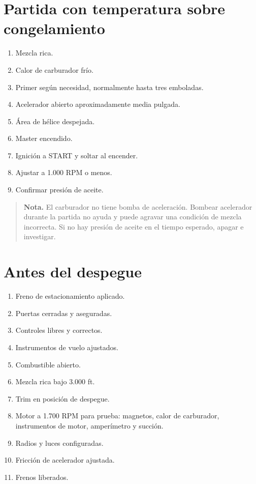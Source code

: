 \documentclass[11pt,oneside]{book}
\newcommand{\note}[1]{\begin{quote}\small\textbf{Nota.} #1\end{quote}}
\newenvironment{checklist}{\begin{enumerate}[label=\arabic*.]}{\end{enumerate}}
\begin{document}
\section{Partida con temperatura sobre congelamiento}

\begin{checklist}
\item Mezcla rica.
\item Calor de carburador frío.
\item Primer según necesidad, normalmente hasta tres emboladas.
\item Acelerador abierto aproximadamente media pulgada.
\item Área de hélice despejada.
\item Master encendido.
\item Ignición a START y soltar al encender.
\item Ajustar a 1.000 RPM o menos.
\item Confirmar presión de aceite.
\end{checklist}

\note{El carburador no tiene bomba de aceleración. Bombear acelerador durante la partida no ayuda y puede agravar una condición de mezcla incorrecta. Si no hay presión de aceite en el tiempo esperado, apagar e investigar.}

\section{Antes del despegue}

\begin{checklist}
\item Freno de estacionamiento aplicado.
\item Puertas cerradas y aseguradas.
\item Controles libres y correctos.
\item Instrumentos de vuelo ajustados.
\item Combustible abierto.
\item Mezcla rica bajo 3.000 ft.
\item Trim en posición de despegue.
\item Motor a 1.700 RPM para prueba: magnetos, calor de carburador, instrumentos de motor, amperímetro y succión.
\item Radios y luces configuradas.
\item Fricción de acelerador ajustada.
\item Frenos liberados.
\end{checklist}
\end{document}
